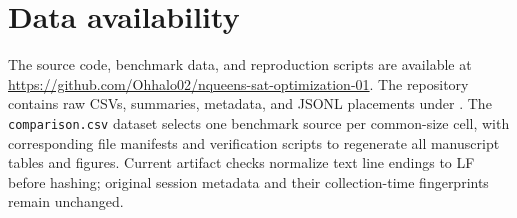 \documentclass[a4paper,fleqn]{cas-sc}
\begin{document}
\section*{Data availability}
The source code, benchmark data, and reproduction scripts are available at \url{https://github.com/Ohhalo02/nqueens-sat-optimization-01}. The repository contains raw CSVs, summaries, metadata, and JSONL placements under . The \texttt{comparison.csv} dataset selects one benchmark source per common-size cell, with corresponding file manifests and verification scripts to regenerate all manuscript tables and figures. Current artifact checks normalize text line endings to LF before hashing; original session metadata and their collection-time fingerprints remain unchanged.



\end{document}
